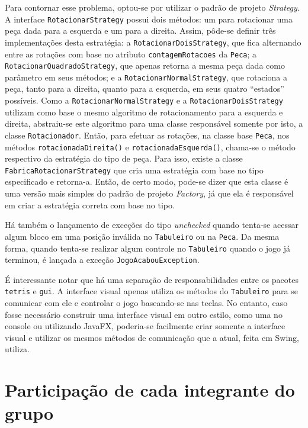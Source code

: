 \documentclass[a4paper, 12pt]{article}
\begin{document}
  Para contornar esse problema, optou-se por utilizar o padrão de projeto
  \emph{Strategy}. A interface \texttt{RotacionarStrategy} possui dois
  métodos: um para rotacionar uma peça dada para a esquerda e um para a direita.
  Assim, pôde-se definir três implementações desta estratégia:
  a \texttt{RotacionarDoisStrategy}, que fica alternando entre as rotações
  com base no atributo \texttt{contagemRotacoes} da \texttt{Peca}; a
  \texttt{RotacionarQuadradoStrategy}, que apenas retorna a mesma
  peça dada como parâmetro em seus métodos; e a \texttt{RotacionarNormalStrategy},
  que rotaciona a peça, tanto para a direita, quanto para a esquerda,
  em seus quatro ``estados'' possíveis. Como a \texttt{RotacionarNormalStrategy}
  e a \texttt{RotacionarDoisStrategy} utilizam como base o mesmo algoritmo
  de rotacionamento para a esquerda e direita, abstraiu-se este algoritmo
  para uma classe responsável somente por isto, a classe \texttt{Rotacionador}.
  Então, para efetuar as rotações, na classe base \texttt{Peca}, nos métodos
  \texttt{rotacionadaDireita()} e \texttt{rotacionadaEsquerda()}, chama-se
  o método respectivo da estratégia do tipo de peça. Para isso, existe
  a classe \texttt{FabricaRotacionarStrategy} que cria uma estratégia
  com base no tipo especificado e retorna-a. Então, de certo modo, pode-se
  dizer que esta classe é uma versão mais simples do padrão de projeto \emph{Factory},
  já que ela é responsável em criar a estratégia correta com base no tipo.

  Há também o lançamento de exceções do tipo \emph{unchecked} quando tenta-se
  acessar algum bloco em uma posição inválida no \texttt{Tabuleiro} ou
  na \texttt{Peca}. Da mesma forma, quando tenta-se realizar algum controle
  no \texttt{Tabuleiro} quando o jogo já terminou, é lançada a exceção
  \texttt{JogoAcabouException}.

  É interessante notar que há uma separação de responsabilidades entre
  os pacotes \texttt{tetris} e \texttt{gui}. A interface visual apenas
  utiliza os métodos do \texttt{Tabuleiro} para se comunicar com ele
  e controlar o jogo baseando-se nas teclas. No entanto, caso fosse
  necessário construir uma interface visual em outro estilo, como
  uma no console ou utilizando JavaFX, poderia-se facilmente
  criar somente a interface visual e utilizar os mesmos métodos
  de comunicação que a atual, feita em Swing, utiliza.

  \section{Participação de cada integrante do grupo}
\end{document}
